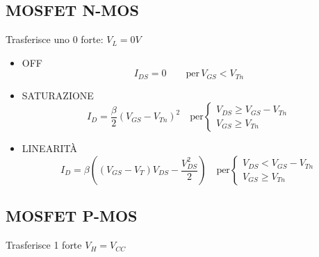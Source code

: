 \documentclass{article}
\begin{document}
\bigbreak%
\subsection*{MOSFET N-MOS}

\begin{minipage}{0.4\textwidth}
\end{minipage}
\begin{minipage}{0.5\textwidth}
    Trasferisce uno 0 forte: $V_L = 0V$
    \begin{itemize}
        \item OFF
            \[ I_{DS} = 0 \qquad \text{per}\, V_{GS} < V_{Tn} \]
        \item SATURAZIONE
            \[ I_D  = \frac{\beta}{2} {(V_{GS} - V_{Tn})}^2 \quad\text{per}
            \begin{cases}
                V_{DS} \ge V_{GS} - V_{Tn}\\
                V_{GS} \ge V_{Tn}
            \end{cases}
        \]
        \item LINEARITÀ
            \[
                I_D = \beta\left((V_{GS} - V_T)V_{DS} - \frac{V_{DS}^2}{2}\right)
                \quad\text{per}
                \begin{cases}
                    V_{DS} < V_{GS} - V_{Tn}\\
                    V_{GS} \ge V_{Tn}
                \end{cases}
            \]
    \end{itemize}
\end{minipage}

\bigbreak%
\subsection*{MOSFET P-MOS}
Trasferisce 1 forte $V_H = V_{CC}$
\end{document}
